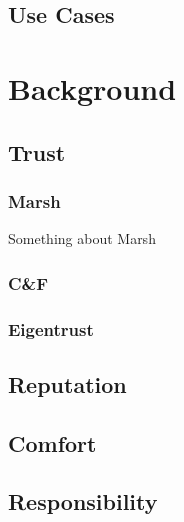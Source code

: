 \subsection{Use Cases}



\section{Background}
\label{sec:background}

\subsection*{Trust}\label{sec:trust}


\subsubsection*{Marsh}\label{sec:marsh}
Something about Marsh\cite{marsh1994}

\subsubsection*{C\&F}\label{sec:cnf}

\subsubsection*{Eigentrust}\label{sec:eigentrust}

\subsection*{Reputation}

\subsection*{Comfort}

\subsection*{Responsibility}


